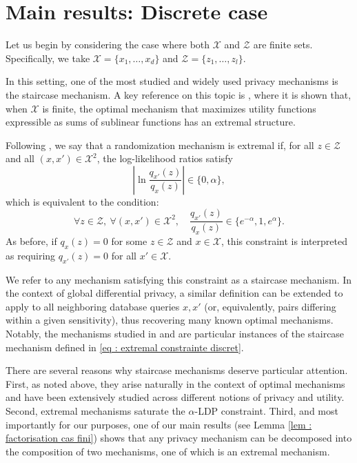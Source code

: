 \documentclass[a4paper, 11pt]{article}
\theoremstyle{definition}
\begin{document}
{\section{Main results: Discrete case}{\label{ss: finite}}
Let us begin by considering the case where both $\mathcal{X}$ and $\mathcal{Z}$ are finite sets. Specifically, we take $\mathcal{X} = \{x_1, \dots, x_d\}$ and $\mathcal{Z} = \{z_1, \dots, z_l\}$.

In this setting, one of the most studied and widely used privacy mechanisms is the staircase mechanism. A key reference on this topic is \cite{kairouzExtremalMechanismsLocal2015}, where it is shown that, when $\mathcal{X}$ is finite, the optimal mechanism that maximizes utility functions expressible as sums of sublinear functions has an extremal structure.

Following \cite{kairouzExtremalMechanismsLocal2015}, we say that a randomization mechanism is extremal if, for all $z \in \mathcal{Z}$ and all $(x, x') \in \mathcal{X}^2$, the log-likelihood ratios satisfy
$$
\left| \ln \frac{q_{x'}(z)}{q_x(z)} \right| \in \{0, \alpha\},
$$
which is equivalent to the condition:
\begin{equation}\label{eq : extremal constrainte discret}
\forall z \in \mathcal{Z}, \ \forall (x,x') \in \mathcal{X}^2, \quad \frac{q_{x'}(z)}{q_x(z)} \in \{e^{-\alpha}, 1, e^\alpha\}.
\end{equation}
As before, if $q_x(z) = 0$ for some $z \in \mathcal{Z}$ and $x \in \mathcal{X}$, this constraint is interpreted as requiring $q_{x'}(z) = 0$ for all $x' \in \mathcal{X}$.

We refer to any mechanism satisfying this constraint as a staircase mechanism. In the context of global differential privacy, a similar definition can be extended to apply to all neighboring database queries $x, x'$ (or, equivalently, pairs differing within a given sensitivity), thus recovering many known optimal mechanisms. Notably, the mechanisms studied in \cite{GenVis12, GenVis13} and \cite{Ghosh12} are particular instances of the staircase mechanism defined in \eqref{eq : extremal constrainte discret}.

There are several reasons why staircase mechanisms deserve particular attention. First, as noted above, they arise naturally in the context of optimal mechanisms and have been extensively studied across different notions of privacy and utility. Second, extremal mechanisms saturate the $\alpha$-LDP constraint. Third, and most importantly for our purposes, one of our main results (see Lemma \ref{lem : factorisation cas fini}) shows that any privacy mechanism can be decomposed into the composition of two mechanisms, one of which is an extremal mechanism.

}
\end{document}
